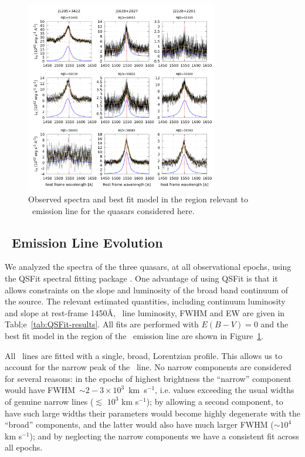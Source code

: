 \documentclass[fleqn,usenatbib]{mnras}
\begin{document}
\begin{figure}
  \centering
  \includegraphics[width=8.40cm, trim=0.37cm 0.3cm 0.0cm 0.2cm, clip]{figures/CIVregions.png}
    \vspace{-18pt}
  \caption{Observed spectra and best fit model in the region relevant
    to \civ\ emission line for the quasars considered here.}
  \label{fig:QSFit-CIV}
\end{figure}
\subsection{\civ\ Emission Line Evolution}
We analyzed the spectra of the three quasars, at all observational
epochs, using the QSFit spectral fitting package
\citep{Calderone2017}.  One advantage of using QSFit is that it allows
constraints on the slope and luminosity of the broad band continuum of
the source. The relevant estimated quantities, including continuum
luminosity and slope at rest-frame 1450\AA, \civ\ line luminosity,
FWHM and EW are given in Tabl;e~\ref{tab:QSFit-results}. All fits are
performed with $E(B-V) = 0$ and the best fit model in the region of
the \civ\ emission line are shown in Figure~\ref{fig:QSFit-CIV}.

All \civ\ lines are fitted with a single, broad, Lorentzian profile.
This allows us to account for the narrow peak of the \civ\ line.  No
narrow components are considered for several reasons: in the epochs of
highest brightness the ``narrow'' component would have FWHM~$\sim2-3
\times 10^{3}$~km~s$^{-1}$, i.e. values exceeding the usual widths of
genuine narrow lines ($\lesssim$ $10^3$ km s$^{-1}$); by allowing a
second component, to have such large widths their parameters would
become highly degenerate with the ``broad'' components, and the latter
would also have much larger FWHM ($\sim$$10^{4}$ km s$^{-1}$); and by
neglecting the narrow components we have a consistent fit across all
epochs.
\end{document}
